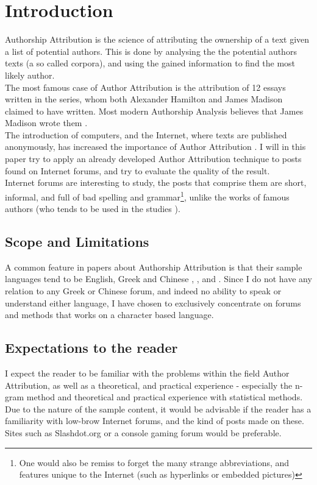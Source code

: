 \section{Introduction}
\label{introduction}
Authorship Attribution is the science of attributing the ownership of a text given a list of potential authors. This is done by analysing the the potential authors texts (a so called corpora), and using the gained information to find the most likely author.\\

The most famous case of Author Attribution is the attribution of 12 essays written in the  series, whom both Alexander Hamilton and James Madison claimed to have written. Most modern Authorship Analysis believes that James Madison wrote them \cite{Fung03thedisputed}.\\
 The introduction of computers, and the Internet, where texts are published anonymously, has increased the importance of Author Attribution . I will in this paper try to apply an already developed Author Attribution technique to posts found on Internet forums, and try to evaluate the quality of the result.\\

Internet forums are interesting to study,  the posts that comprise them are short, informal, and full of bad spelling and grammar\footnote{One would also be remiss to forget the many strange abbreviations, and features unique to the Internet (such as hyperlinks or embedded pictures)}, unlike the works of famous authors (who tends to be used in the studies \cite{nr4}). 

\subsection{Scope and Limitations}
\label{scope}
A common feature in papers about Authorship Attribution is that their sample languages tend to be English, Greek and Chinese \cite{syntactic}, \cite{nr2}, \cite{nr4} and \cite{app-spe}. Since I do not have any relation to any Greek or Chinese forum, and indeed no ability to speak or understand either language, I have chosen to exclusively concentrate on forums and methods that works on a character based language.

\subsection{Expectations to the reader}
\label{expectations}
I expect the reader to be familiar with the problems within the field Author Attribution, as well as a theoretical, and practical experience - especially the n-gram method and theoretical and practical experience with statistical methods. Due to the nature of the sample content, it would be advisable if the reader has a familiarity with low-brow Internet forums, and the kind of posts made on these. Sites such as Slashdot.org or a console gaming forum would be preferable.

